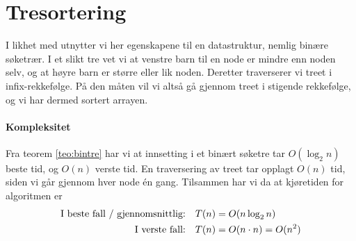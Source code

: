 \section{Tresortering}\label{treesort}
I likhet med  utnytter vi her egenskapene til en datastruktur,
nemlig binære søketrær. I et slikt tre vet vi at venstre barn til en node er
mindre enn noden selv, og at høyre barn er større eller lik noden.
Deretter traverserer vi treet i infix-rekkefølge. På den måten vil vi altså gå
gjennom treet i stigende rekkefølge, og vi har dermed sortert arrayen.

\paragraph{Kompleksitet}
Fra teorem \ref{teo:bintre} har vi at innsetting i et binært søketre tar $ O(\log_2 n) $ beste tid, og $ O(n) $ verste tid. En traversering av treet tar opplagt $ O(n) $ tid, siden vi går gjennom hver node én gang. Tilsammen har vi da at kjøretiden for algoritmen er 
\begin{align*}
\text{I beste fall / gjennomsnittlig:\quad} & T(n) = O(n\log_2 n)\\
\text{I verste fall:\quad} & T(n) = O(n\cdot n) = O(n^2)
\end{align*}
